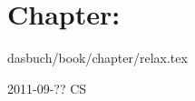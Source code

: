 

\section{Chapter: }\noindent dasbuch/book/chapter/relax.tex
\begin{description}\item[2011-09-?? CS]

\end{description}


%
%
%
%
%
%
%
%
%
%
%
%
%
%
